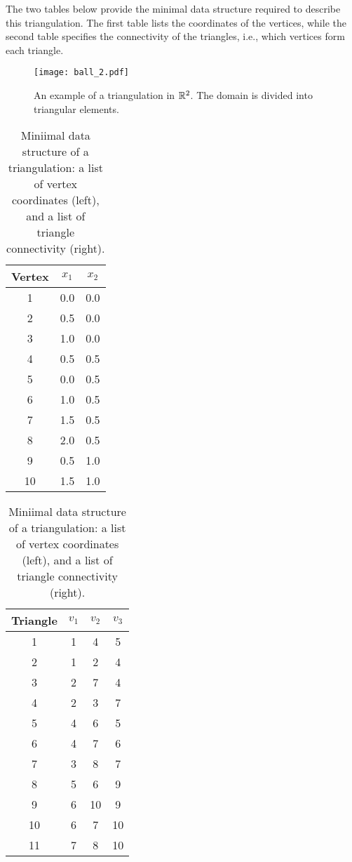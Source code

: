 The two tables below provide the minimal data structure required to describe this triangulation. The first table lists the coordinates of the vertices, while the second table specifies the connectivity of the triangles, i.e., which vertices form each triangle.

\begin{figure}[!htb]
\centering
\texttt{[image: ball\_2.pdf]}
\caption{An example of a triangulation in $\mathbb{R}^2$. The domain is divided into triangular elements.}
\label{fig:triangulation}
\end{figure}

\begin{table}[!htb]
  \centering
  \caption{Miniimal data structure of a triangulation: a list of vertex coordinates (left), and a list of triangle connectivity (right).}
  \label{tab:vertex-coordinates}
  \begin{minipage}[t]{0.45\textwidth}
    \centering
  \begin{tabular}{|c|c|c|}
  \hline
  \textbf{Vertex} & $x_1$ & $x_2$ \\ \hline
  1 & 0.0 & 0.0 \\ \hline
  2 & 0.5 & 0.0 \\ \hline
  3 & 1.0 & 0.0 \\ \hline
  4 & 0.5 & 0.5 \\ \hline
  5 & 0.0 & 0.5 \\ \hline
  6 & 1.0 & 0.5 \\ \hline
  7 & 1.5 & 0.5 \\ \hline
  8 & 2.0 & 0.5 \\ \hline
  9 & 0.5 & 1.0 \\ \hline
  10 & 1.5 & 1.0 \\ \hline
  \end{tabular}
\end{minipage}
\begin{minipage}[t]{0.45\textwidth}
  \centering
  \begin{tabular}{|c|c|c|c|}
    \hline
    \textbf{Triangle} & $v_1$ & $v_2$ & $v_3$ \\ \hline
    1 & 1 & 4 &  5 \\ \hline
    2 & 1 & 2 &  4  \\ \hline
    3 & 2 & 7 &  4 \\ \hline
    4 & 2 & 3 &  7 \\ \hline
    5 & 4 & 6 &  5 \\ \hline
    6 & 4 & 7 &  6 \\ \hline
    7 & 3 & 8 &  7 \\ \hline
    8 & 5 & 6 &  9 \\ \hline
    9 & 6 & 10 &  9  \\ \hline
    10 & 6 & 7 &  10 \\ \hline
    11 & 7 & 8 &  10 \\ \hline
    \end{tabular}
\end{minipage}
\end{table}

